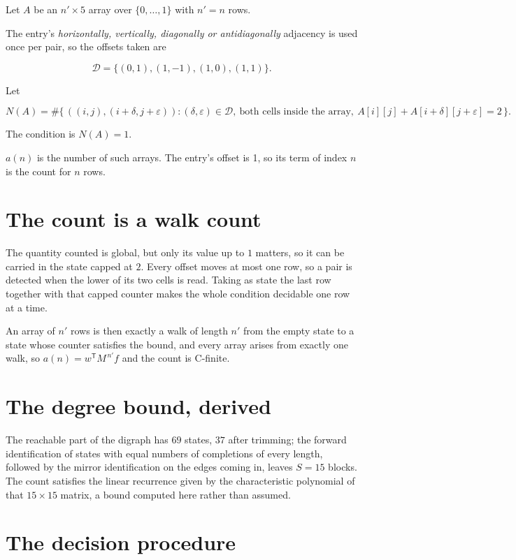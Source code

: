 \documentclass[11pt]{article}
\theoremstyle{definition}
\begin{document}
Let $A$ be an $n' \times 5$ array over $\{0,\dots,1\}$ with $n' = n$ rows.

The entry's {\itshape horizontally, vertically, diagonally or antidiagonally} adjacency is used once per pair, so the offsets taken are

\[\mathcal{D} = \{(0,1), (1,-1), (1,0), (1,1)\}.\]

Let

\[N(A) = \#\bigl\{\,((i,j),(i{+}\delta,j{+}\varepsilon)) : (\delta,\varepsilon) \in \mathcal{D},\ \text{both cells inside the array},\ A[i][j] + A[i{+}\delta][j{+}\varepsilon] = 2\,\bigr\}.\]

The condition is $N(A) = 1$.

$a(n)$ is the number of such arrays. The entry's offset is 1, so its term of index $n$ is the count for $n$ rows.

\section{The count is a walk count}

The quantity counted is global, but only its value up to $1$ matters, so it can be carried in the state capped at $2$. Every offset moves at most one row, so a pair is detected when the lower of its two cells is read. Taking as state the last row together with that capped counter makes the whole condition decidable one row at a time.

An array of $n'$ rows is then exactly a walk of length $n'$ from the empty state to a state whose counter satisfies the bound, and every array arises from exactly one walk, so $a(n) = w^{\mathsf T}M^{\,n'}f$ and the count is C-finite.

\section{The degree bound, derived}

The reachable part of the digraph has $69$ states, $37$ after trimming; the forward identification of states with equal numbers of completions of every length, followed by the mirror identification on the edges coming in, leaves $S = 15$ blocks. The count satisfies the linear recurrence given by the characteristic polynomial of that $15\times15$ matrix, a bound computed here rather than assumed.

\section{The decision procedure}
\end{document}
